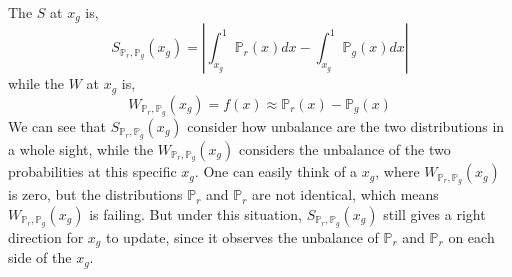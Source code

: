 \documentclass[letterpaper]{article} %
\begin{document}
The $S$ at $x_g$ is,
\begin{equation}\label{s-distance-at-xg}
  S_{\mathbb{P}_r,\mathbb{P}_g}(x_g)= | \int_{x_g}^{1} \mathbb{P}_r(x) d x - \int_{x_g}^{1} \mathbb{P}_g(x) d x |
\end{equation}
while the $W$ at $x_g$ is,
\begin{equation}\label{w-distance-xg}
  W_{\mathbb{P}_r,\mathbb{P}_g}(x_g) = f(x) \approx \mathbb{P}_r(x) - \mathbb{P}_g(x)
\end{equation}
We can see that $S_{\mathbb{P}_r,\mathbb{P}_g}(x_g)$ consider how unbalance are the two distributions in a whole sight, while the $W_{\mathbb{P}_r,\mathbb{P}_g}(x_g)$ considers the unbalance of the two probabilities at this specific $x_g$. One can easily think of a $x_g$, where $W_{\mathbb{P}_r,\mathbb{P}_g}(x_g)$ is zero, but the distributions $\mathbb{P}_r$ and $\mathbb{P}_r$ are not identical, which means $W_{\mathbb{P}_r,\mathbb{P}_g}(x_g)$ is failing. But under this situation, $S_{\mathbb{P}_r,\mathbb{P}_g}(x_g)$ still gives a right direction for $x_g$ to update, since it observes the unbalance of $\mathbb{P}_r$ and $\mathbb{P}_r$ on each side of the $x_g$.
\end{document}
